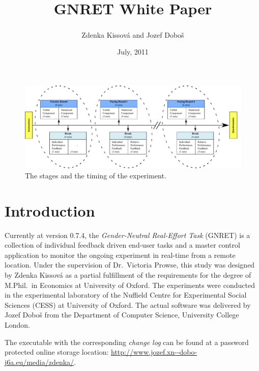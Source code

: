\documentclass[a4paper,11pt,oneside]{article}
\title{\vspace{-42pt}GNRET White Paper}
\date{July, 2011}
\author{
  Zdenka Kissov\'{a} and Jozef Dobo\v{s}\textsuperscript{\dag} \\
  \small{
  	\ttfamily{
  		\textsuperscript{\dag}\href{mailto:j.dobos@cs.ucl.ac.uk}{j.dobos@cs.ucl.ac.uk}
  	}
  }
}
\begin{document}
\maketitle


\begin{figure}[htb]
  \begin{center}
    \includegraphics[width=\linewidth]{images/fig1-4.pdf}
    \caption{The stages and the timing of the experiment.}
    \label{fig:experiment-stages}
  \end{center}      
\end{figure}
\vspace{-2em}
\section{Introduction}
Currently at version 0.7.4, the \emph{Gender-Neutral Real-Effort Task} (GNRET) is a collection of individual feedback driven end-user tasks and a master control application to monitor the ongoing experiment in real-time from a remote location. Under the supervision of Dr.~Victoria Prowse, this study was designed by Zdenka Kissov\'{a} as a partial fulfillment of the requirements for the degree of M.Phil.~in Economics at University of Oxford. The experiments were conducted in the experimental laboratory of the Nuffield Centre for Experimental Social Sciences (CESS) at University of Oxford. The actual software was delivered by Jozef Dobo\v{s} from the Department of Computer Science, University College London.
	
		
The executable with the corresponding \emph{change log} can be found at a password protected online storage location: \url{http://www.jozef.xn--dobo-j6a.eu/media/zdenka/}.
\end{document}
